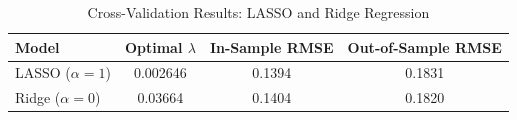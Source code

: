 \begin{table}[H]
\centering
\caption{Cross-Validation Results: LASSO and Ridge Regression}
\label{tab:results}
\begin{tabular}{lccc}
\hline\hline
Model & Optimal $\lambda$ & In-Sample RMSE & Out-of-Sample RMSE \\
\hline
LASSO ($\alpha = 1$)  & 0.002646 & 0.1394 & 0.1831 \\
Ridge ($\alpha = 0$)  & 0.03664  & 0.1404 & 0.1820 \\
\hline\hline
\end{tabular}
\end{table}
